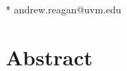 \documentclass[10pt,letterpaper]{article}
\date{}
\begin{document}
\vspace*{0.35in}

\begin{flushleft}
{\Large
\textbf{}
}
\newline
\\

\bigskip






* andrew.reagan@uvm.edu

\end{flushleft}
\section*{Abstract}
\begin{abstract}
    
\end{abstract}

\linenumbers



\end{document}
